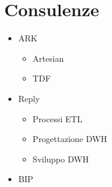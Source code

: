 \section{Consulenze}
    \begin{itemize}
        \item ARK \cite{bib:ark_url}
            \begin{itemize}
                \item Artesian
                \item TDF
            \end{itemize}
        \item Reply \cite{bib:reply_url}
            \begin{itemize}
                \item Processi ETL
                \item Progettazione DWH
                \item Sviluppo DWH
            \end{itemize}
        \item BIP \cite{bib:bip_url}
    \end{itemize}